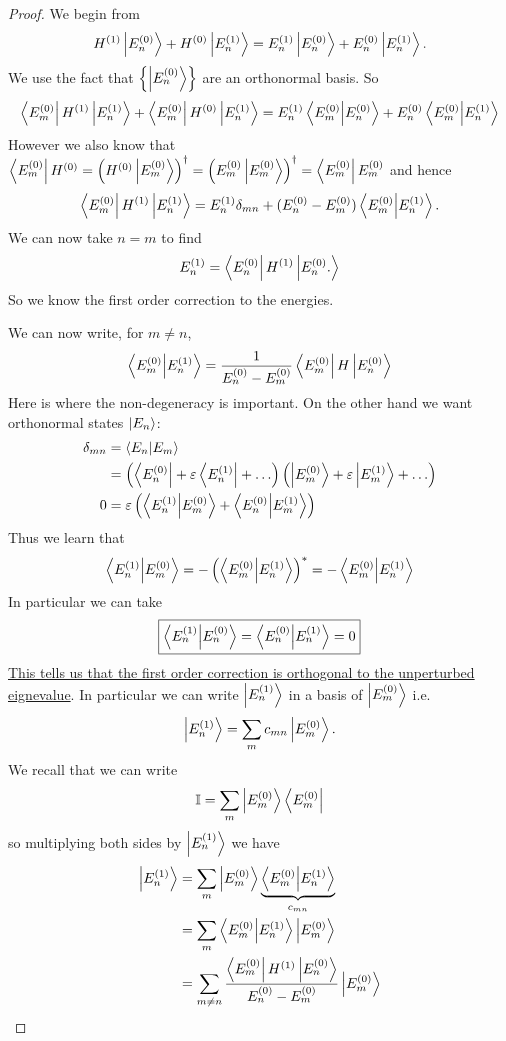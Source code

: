 \documentclass[12pt, a4paper]{article}
\begin{document}
\begin{proof}
    We begin from 
    \[H^{(1)}\ket{E_n^{(0)}} + H^{(0)}\ket{E_n^{(1)}} = E_n^{(1)}\ket{E_n^{(0)}} + E_n^{(0)}\ket{E_n^{(1)}}.\]
    We use the fact that \( \left\{ \ket{E_n^{(0)}} \right\} \) are an orthonormal basis. So
    \[\bra{E_m^{(0)}} H^{(1)} \ket{E_n^{(1)}} + \bra{E_m^{(0)}} H^{(0)} \ket{E_n^{(1)}} = E_n^{(1)} \braket{E_m^{(0)}}{E_n^{(0)}} + E_n^{(0)} \braket{E_m^{(0)}}{E_n^{(1)}}\]
    However we also know that \( \bra{E_m^{(0)}} H^{(0)} = \left(H^{(0)}\ket{E_m^{(0)}} \right)^\dagger = \left( E_m^{(0)} \ket{E_m^{(0)}} \right)^{\dagger} = \bra{E_m^{(0)}} E_m^{(0)}\) and hence
    \[\bra{E_m^{(0)}} H^{(1)} \ket{E_n^{(1)}} = E_n^{(1)} \delta_{mn} + (E_n^{(0)} - E_m^{(0)}) \braket{E_m^{(0)}}{E_n^{(1)}}.\]
    We can now take \( n = m \) to find
    \[E_n^{(1)} = \bra{E_n^{(0)}} H^{(1)} \ket{E_n^{(0)}.}\]
    So we know the first order correction to the energies. 
    
    We can now write, for \( m \neq n \),
    \[\braket{E_m^{(0)}}{E_n^{(1)}} = \frac{1}{E_n^{(0)} - E_m^{(0)}} \bra{E_m^{(0)}} H \ket{E_n^{(0)}}\]
    Here is where the non-degeneracy is important. On the other hand we want orthonormal states \( \ket{E_n} \):
    \[\begin{aligned}
        \delta_{mn} &= \braket{E_n}{E_m} \\
        &= \left( \bra{E^{(0)}_n} + \varepsilon \bra{E^{(1)}_n} + \ldots \right) \left( \ket{E^{(0)}_m} + \varepsilon \ket{E^{(1)}_m} + \ldots \right) \\
        0 &= \varepsilon \left( \bra{E^{(1)}_n} \ket{E^{(0)}_m} + \bra{E^{(0)}_n} \ket{E^{(1)}_m} \right)
    \end{aligned}\]
    Thus we learn that
    \[\bra{E^{(1)}_n} \ket{E^{(0)}_m} = -\left( \bra{E^{(0)}_m} \ket{E^{(1)}_n} \right)^* = -\bra{E^{(0)}_m} \ket{E^{(1)}_n}\]In particular we can take
    \[\fbox{\(\bra{E^{(1)}_n} \ket{E^{(0)}_n} = \bra{E^{(0)}_n} \ket{E^{(1)}_n} = 0\)}\]
    \ul{This tells us that the first order correction is orthogonal to the unperturbed eignevalue}.
    In particular we can write \(\ket{E_n^{(1)}}\) in a basis of \(\ket{E_m^{(0)}}\) i.e. 
    \[\ket{E_n^{(1)}} = \sum_m c_{mn} \ket{E_m^{(0)}}.\]
    We recall that we can write 
    \[\mathbb{I} = \sum_m \ket{E_m^{(0)}}\bra{E_m^{(0)}}\]
    so multiplying both sides by \(\ket{E_n^{(1)}}\) we have 
    \[\begin{aligned}
        \ket{E_n^{(1)}} &= \sum_m \ket{E_m^{(0)}}\underbrace{\bra{E_m^{(0)}}\ket{E_n^{(1)}}}_{c_{mn}} \\
        &=  \sum_m  \bra{E_m^{(0)}}\ket{E_n^{(1)}}\ket{E_m^{(0)}} \\
        &= \sum_{m \neq n} \frac{\bra{E_m^{(0)}} H^{(1)} \ket{E_n^{(0)}}}{E_n^{(0)} - E_m^{(0)}}  \ket{E_m^{(0)}}
    \end{aligned}\]
\end{proof}
\end{document}
